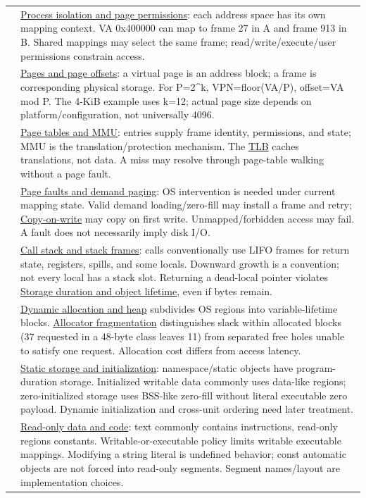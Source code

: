 {\begin{longtable}[]{@{}
  >{\raggedright\arraybackslash}p{}
  >{\raggedright\arraybackslash}p{}@{}}
53 & \hyperref[appendix-c2a9ad1e2b49]{Process isolation and page permissions}: each address space has its own mapping context. VA 0x400000 can map to frame 27 in A and frame 913 in B. Shared mappings may select the same frame; read/write/execute/user permissions constrain access. \\
54 & \hyperref[appendix-0c67cd5bf30a]{Pages and page offsets}: a virtual page is an address block; a frame is corresponding physical storage. For P=2\^{}k, VPN=floor(VA/P), offset=VA mod P. The 4-KiB example uses k=12; actual page size depends on platform/configuration, not universally 4096. \\
55 & \hyperref[appendix-01e5905165c4]{Page tables and MMU}: entries supply frame identity, permissions, and state; MMU is the translation/protection mechanism. The \hyperref[appendix-7a2d9c5ce511]{TLB} caches translations, not data. A miss may resolve through page-table walking without a page fault. \\
56 & \hyperref[appendix-cc0909a7ef14]{Page faults and demand paging}: OS intervention is needed under current mapping state. Valid demand loading/zero-fill may install a frame and retry; \hyperref[appendix-7a06e5baac04]{Copy-on-write} may copy on first write. Unmapped/forbidden access may fail. A fault does not necessarily imply disk I/O. \\
57 & \hyperref[appendix-b081b7abe193]{Call stack and stack frames}: calls conventionally use LIFO frames for return state, registers, spills, and some locals. Downward growth is a convention; not every local has a stack slot. Returning a dead-local pointer violates \hyperref[appendix-0b104bcba06b]{Storage duration and object lifetime}, even if bytes remain. \\
58 & \hyperref[appendix-c3480f7d9ff3]{Dynamic allocation and heap} subdivides OS regions into variable-lifetime blocks. \hyperref[appendix-a7c50686d81f]{Allocator fragmentation} distinguishes slack within allocated blocks (37 requested in a 48-byte class leaves 11) from separated free holes unable to satisfy one request. Allocation cost differs from access latency. \\
59 & \hyperref[appendix-17c93c4c2f19]{Static storage and initialization}: namespace/static objects have program-duration storage. Initialized writable data commonly uses data-like regions; zero-initialized storage uses BSS-like zero-fill without literal executable zero payload. Dynamic initialization and cross-unit ordering need later treatment. \\
60 & \hyperref[appendix-5f9e5e2f0a5e]{Read-only data and code}: text commonly contains instructions, read-only regions constants. Writable-or-executable policy limits writable executable mappings. Modifying a string literal is undefined behavior; const automatic objects are not forced into read-only segments. Segment names/layout are implementation choices. \\
\end{longtable}
}

